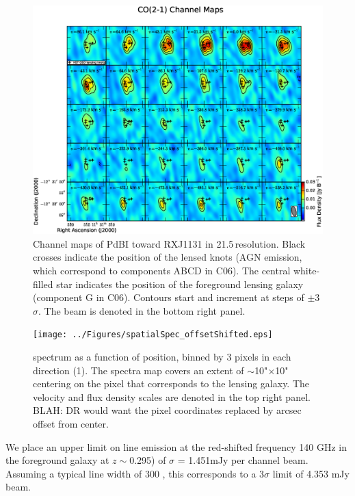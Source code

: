 \documentclass[]{emulateapj}
\begin{document}
\begin{figure}[tbph]
\centering
\includegraphics[width=1.0\textwidth]{../Figures/co_channel_maps.eps}
\caption{
Channel maps of PdBI \bco toward RXJ1131 in 21.5\,\kms resolution.
Black crosses indicate the position of the lensed knots (AGN emission,
which correspond to components ABCD in C06). The central white-filled
star indicates the position of the foreground lensing galaxy (component G
in C06). Contours start and increment at steps of
$\pm$3$\sigma$. The beam is denoted in the bottom right panel. \label{fig:chanmap}}
\end{figure}

\begin{figure}[tbph]
\centering
\texttt{[image: ../Figures/spatialSpec\_offsetShifted.eps]}
\caption{
\bco spectrum as a function of position, binned by 3 pixels in each
direction (1). The spectra map covers an extent of $\sim$10"$\times$10"
centering on the pixel that corresponds to the lensing galaxy. The velocity
and flux density scales are denoted in the top right panel.
BLAH: DR would want the pixel coordinates replaced by arcsec offset from
center. \label{fig:spatialSpec}}
\end{figure}

We place an upper limit on  line emission at the red-shifted
frequency 140 GHz in the foreground galaxy at $z\sim$0.295) of
$\sigma$ = 1.451mJy per channel beam\pmOne.
Assuming a typical line width of 300 \kms, this corresponds to a 3$\sigma$
limit of 4.353 mJy \kms beam\pmOne.
\end{document}
